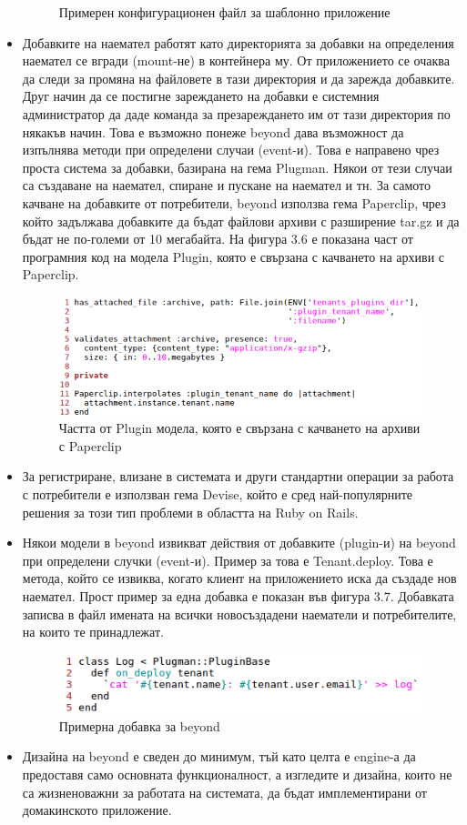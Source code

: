 \documentclass[pdftex,14pt,a4paper]{extreport}
\begin{document}
\begin{itemize}
\begin{figure}[h]
    \caption{Примерен конфигурационен файл за шаблонно приложение}
  \end{figure}
\item Добавките на наемател работят като директорията за добавки на определения наемател се вгради (mount-не) в контейнера му. От приложението се очаква да следи за промяна на файловете в тази директория и да зарежда добавките. Друг начин да се постигне зареждането на добавки е системния администратор да даде команда за презареждането им от тази директория по някакъв начин. Това е възможно понеже beyond дава възможност да изпълнява методи при определени случаи (event-и). Това е направено чрез проста система за добавки, базирана на гема Plugman. Някои от тези случаи са създаване на наемател, спиране и пускане на наемател и тн. За самото качване на добавките от потребители, beyond използва гема Paperclip, чрез който задължава добавките да бъдат файлови архиви с разширение tar.gz и да бъдат не по-големи от 10 мегабайта. На фигура 3.6 е показана част от програмния код на модела Plugin, която е свързана с качването на архиви с Paperclip.
  \begin{figure}[h]
    \centering
    \includegraphics[scale=0.8]{./snippets/plugin_archive}
    \caption{Частта от Plugin модела, която е свързана с качването на архиви с Paperclip}
  \end{figure}
  \item За регистриране, влизане в системата и други стандартни операции за работа с потребители е използван гема Devise, който е сред най-популярните решения за този тип проблеми в областта на Ruby on Rails.
  \item Някои модели в beyond извикват действия от добавките (plugin-и) на beyond при определени случки (event-и). Пример за това е Tenant.deploy. Това е метода, който се извиква, когато клиент на приложението иска да създаде нов наемател. Прост пример за една добавка е показан във фигура 3.7. Добавката записва в файл имената на всички новосъздадени наематели и потребителите, на които те принадлежат.
  \begin{figure}[h]
    \centering
    \includegraphics[scale=0.8]{./snippets/beyond_plugin}
    \caption{Примерна добавка за beyond}
  \end{figure}
  \item Дизайна на beyond е сведен до минимум, тъй като целта е engine-а да предоставя само основната функционалност, а изгледите и дизайна, които не са жизненоважни за работата на системата, да бъдат имплементирани от домакинското приложение.
\end{itemize}
\end{document}

